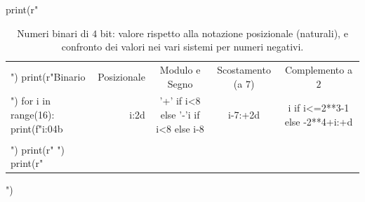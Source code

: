 \begin{table}\sffamily\centering
\renewcommand{\arraystretch}{1.2}
\begin{pycode}
print(r"\begin{tabular}{l|rccc}")
print(r"Binario & Posizionale & Modulo e Segno & Scostamento (a $7$) & Complemento a $2$ \\ ")
for i in range(16):
        print(f"{i:04b} & {i:2d} & {'+' if i<8 else '-'}{i if i<8 else i-8}  & {i-7:+2d} & {i if i<=2**3-1 else -2**4+i:+d} \\\\")
print(r" \hline\noalign{\smallskip}")
print(r"\end{tabular}")
\end{pycode}
\caption{Numeri binari di $4$ bit: valore rispetto alla notazione posizionale (naturali), e confronto dei valori nei vari sistemi per numeri negativi.}
\label{tab:zeta}
\end{table}
